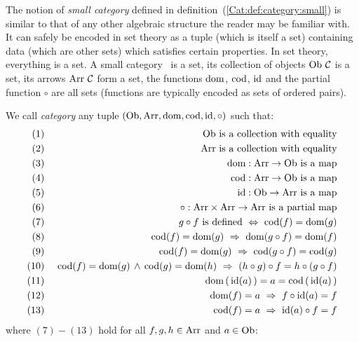 The notion of {\em small category} defined in 
definition~(\ref{Cat:def:category:small}) is similar to that of any other 
algebraic structure the reader may be familiar with. It can safely be encoded 
in set theory as a tuple (which is itself a set) containing data (which are 
other sets) which satisfies certain properties. In set theory, everything is a 
set. A small category \Cat\ is a set, its collection of objects $\ob\ \Cat$ is 
a set, its arrows $\arr\ \Cat$ form a set, the functions $\mbox{\rm dom}$, $\mbox{\rm cod}$, $\mbox{\rm id}$ 
and the partial function $\circ$ are all sets (functions are typically encoded
as sets of ordered pairs). 
\begin{defin}\label{Cat:def:category}
    We call {\em category} any tuple $(\mbox{\rm Ob}, \mbox{\rm Arr}, \mbox{\rm dom}, \mbox{\rm cod}, \mbox{\rm id}, \circ)$ 
    such that:
        \begin{eqnarray*}
            (1)&\ &\mbox{\rm Ob}\mbox{\ is a collection with equality}\\
            (2)&\ &\mbox{\rm Arr}\mbox{\ is a collection with equality}\\
            (3)&\ &\mbox{\rm dom}:\mbox{\rm Arr}\to\mbox{\rm Ob}\mbox{\ is a map}\\
            (4)&\ &\mbox{\rm cod}:\mbox{\rm Arr}\to\mbox{\rm Ob}\mbox{\ is a map}\\
            (5)&\ &\mbox{\rm id}:\mbox{\rm Ob}\to\mbox{\rm Arr}\mbox{\ is a map}\\
            (6)&\ &\circ:\mbox{\rm Arr}\times\mbox{\rm Arr}\to\mbox{\rm Arr}\mbox{\ is a partial map}\\
            (7)&\ &g\circ f\mbox{\ is defined}
                \ \Leftrightarrow\ \mbox{\rm cod}(f)=\mbox{\rm dom}(g) \\
            (8)&\ &\mbox{\rm cod}(f)=\mbox{\rm dom}(g)\ \Rightarrow\ \mbox{\rm dom}(g\circ f) = \mbox{\rm dom}(f)\\
            (9)&\ &\mbox{\rm cod}(f)=\mbox{\rm dom}(g)\ \Rightarrow\ \mbox{\rm cod}(g\circ f) = \mbox{\rm cod}(g)\\
            (10)&\ &\mbox{\rm cod}(f)=\mbox{\rm dom}(g)\,\land\,\mbox{\rm cod}(g)=\mbox{\rm dom}(h)
               \ \Rightarrow\ (h\circ g)\circ f = h\circ(g\circ f)\\
            (11)&\ &\mbox{\rm dom}\,(\,\mbox{\rm id}(a)\,) = a = \mbox{\rm cod}\,(\,\mbox{\rm id}(a)\,)\\
            (12)&\ &\mbox{\rm dom}(f)=a\ \Rightarrow\ f\circ\mbox{\rm id}(a) = f\\
            (13)&\ &\mbox{\rm cod}(f)=a\ \Rightarrow\ \mbox{\rm id}(a)\circ f = f
       \end{eqnarray*} 
    where $(7)-(13)$ hold for all $f,g,h\in\mbox{\rm Arr}$ and $a\in\mbox{\rm Ob}$: 
\end{defin}

